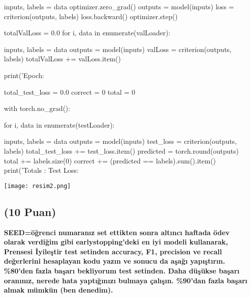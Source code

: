 \documentclass[11pt]{article}
\begin{document}
\begin{python}
        inputs, labels = data
        optimizer.zero_grad()
        outputs = model(inputs)
        loss = criterion(outputs, labels)
        loss.backward()
        optimizer.step()

    totalValLoss = 0.0
    for i, data in enumerate(valLoader):

        inputs, labels = data
        outputs = model(inputs)
        valLoss = criterion(outputs, labels)
        totalValLoss += valLoss.item()

    print('Epoch: %

total_test_loss = 0.0
correct = 0
total = 0

with torch.no_grad():

    for i, data in enumerate(testLoader):

        inputs, labels = data
        outputs = model(inputs)
        test_loss = criterion(outputs, labels)
        total_test_loss += test_loss.item()
        predicted = torch.round(outputs)
        total += labels.size(0)
        correct += (predicted == labels).sum().item()
print('Totals : Test Loss: %

\end{python}
\begin{center}
    \centering
    \texttt{[image: resim2.png]}
    \label{fig:my_pic}
\end{center}


\subsection{(10 Puan)} \textbf{SEED=öğrenci numaranız set ettikten sonra altıncı haftada ödev olarak verdiğim gibi earlystopping'deki en iyi modeli kullanarak, Prensesi İyileştir test setinden accuracy, F1, precision ve recall değerlerini hesaplayan kodu yazın ve sonucu da aşağı yapıştırın. \%80'den fazla başarı bekliyorum test setinden. Daha düşükse başarı oranınız, nerede hata yaptığınızı bulmaya çalışın. \%90'dan fazla başarı almak mümkün (ben denedim).}
\end{document}
